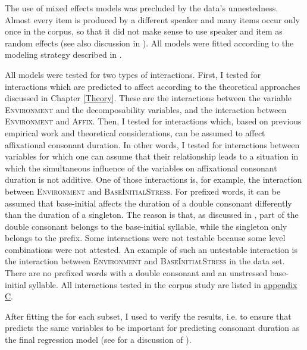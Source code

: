 The use of mixed effects models was precluded by the data's unnestedness. Almost every item is produced by a different speaker and many items occur only once in the corpus, so that it did not make sense to use speaker and item as random effects (see also discussion in ). All models were fitted according to the modeling strategy described in .



All models were tested for two types of  interactions. First, I tested for interactions which are predicted to affect  according to the theoretical approaches discussed in Chapter \ref{Theory}. These  are the interactions between the variable \textsc{Environment} and the decomposability variables, and the interaction between \textsc{Environment} and \textsc{Affix}.
Then, I tested for interactions which, based on previous empirical work and theoretical considerations, can be assumed to affect affixational consonant duration. In other words, I tested for interactions between variables for which one can assume that their relationship leads to a situation in which the simultaneous influence of the variables on affixational consonant duration is not additive. One of those interactions is, for example, the interaction between \textsc{Environment} and \textsc{BaseInitialStress}. For prefixed words, it can be assumed that base-initial  affects the duration of a double consonant differently than the duration of a singleton. The reason is that, as discussed in , part of the double consonant belongs to the base-initial syllable, while the singleton only belongs to the prefix. 
Some interactions were not testable because some level combinations were not attested. An example of such an untestable interaction is the interaction between \textsc{Environment} and \textsc{BaseInitialStress} in the data set. There are no prefixed words with a double consonant and an unstressed base-initial syllable. All interactions tested in the corpus study are listed in \hyperref[Appendix C: Summaries of tested interactions in corpus study]{appendix C}.

After fitting the  for each subset, I used  to verify the results, i.e. to ensure that  predicts the same variables to be important for predicting consonant duration as the final regression model (see  for a discussion of ).




